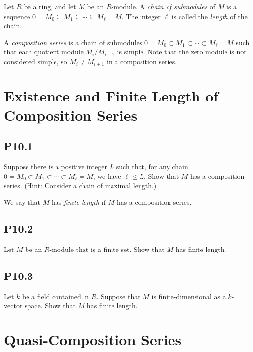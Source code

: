\documentclass[lang=cn,11pt]{template}
\begin{document}
\begin{definition}
Let \( R \) be a ring, and let \( M \) be an \( R \)-module. A \textit{chain of submodules} of \( M \) is a sequence \( 0 = M_0 \subseteq M_1 \subseteq \cdots \subseteq M_\ell = M \). The integer \( \ell \) is called the \textit{length} of the chain.
\end{definition}

\begin{definition}
A \textit{composition series} is a chain of submodules \( 0 = M_0 \subset M_1 \subset \cdots \subset M_\ell = M \) such that each quotient module \( M_i / M_{i-1} \) is simple. Note that the zero module is not considered simple, so \( M_i \neq M_{i+1} \) in a composition series.
\end{definition}

\section{Existence and Finite Length of Composition Series}

\subsection*{P10.1} Suppose there is a positive integer \( L \) such that, for any chain \( 0 = M_0 \subset M_1 \subset \cdots \subset M_\ell = M \), we have \( \ell \leq L \). Show that \( M \) has a composition series. (Hint: Consider a chain of maximal length.)

\begin{definition}
We say that \( M \) has \textit{finite length} if \( M \) has a composition series.
\end{definition}

\subsection*{P10.2} Let \( M \) be an \( R \)-module that is a finite set. Show that \( M \) has finite length.

\subsection*{P10.3} Let \( k \) be a field contained in \( R \). Suppose that \( M \) is finite-dimensional as a \( k \)-vector space. Show that \( M \) has finite length.

\section{Quasi-Composition Series}
\end{document}
